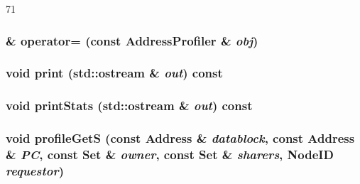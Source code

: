 \begin{DoxyCode}
71 {}
\end{DoxyCode}
\hypertarget{classAddressProfiler_a0473a7090f98a61e75343ebc48ae55f0}{
\subsubsection[{operator=}]{\& operator= (const {\bf AddressProfiler} \& {\em obj})}}
\label{classAddressProfiler_a0473a7090f98a61e75343ebc48ae55f0}
\hypertarget{classAddressProfiler_ac55fe386a101fbae38c716067c9966a0}{
\subsubsection[{print}]{\setlength{\rightskip}{0pt plus 5cm}void print (std::ostream \& {\em out}) const}}
\label{classAddressProfiler_ac55fe386a101fbae38c716067c9966a0}
\hypertarget{classAddressProfiler_a38f932a0a623730fe10783f46d243cef}{
\subsubsection[{printStats}]{\setlength{\rightskip}{0pt plus 5cm}void printStats (std::ostream \& {\em out}) const}}
\label{classAddressProfiler_a38f932a0a623730fe10783f46d243cef}
\hypertarget{classAddressProfiler_a79a57b3f376ac7ef7a55bf73dcff3402}{
\subsubsection[{profileGetS}]{\setlength{\rightskip}{0pt plus 5cm}void profileGetS (const {\bf Address} \& {\em datablock}, \/  const {\bf Address} \& {\em PC}, \/  const {\bf Set} \& {\em owner}, \/  const {\bf Set} \& {\em sharers}, \/  {\bf NodeID} {\em requestor})}}
\label{classAddressProfiler_a79a57b3f376ac7ef7a55bf73dcff3402}



